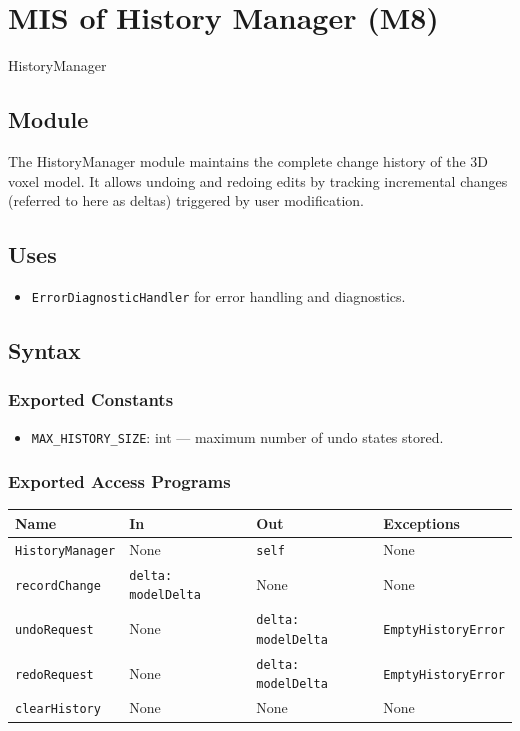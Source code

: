 \documentclass[12pt, titlepage]{article}
\begin{document}
\section{MIS of History Manager (M8)}\label{Module10}

HistoryManager

\subsection{Module}
The HistoryManager module maintains the complete change history of the 3D voxel model. It allows undoing and redoing edits by tracking incremental changes (referred to here as deltas) triggered by user modification.

\subsection{Uses}
\begin{itemize}
  \item \texttt{ErrorDiagnosticHandler} for error handling and diagnostics.
\end{itemize}

\subsection{Syntax}

\subsubsection{Exported Constants}
\begin{itemize}
  \item \texttt{MAX\_HISTORY\_SIZE}: int — maximum number of undo states stored.
\end{itemize}

\subsubsection{Exported Access Programs}
\begin{center}
\renewcommand{\arraystretch}{1.3}
\begin{tabular}{p{4cm} p{4.5cm} p{3.5cm} p{3.5cm}}
\toprule
\textbf{Name} & \textbf{In} & \textbf{Out} & \textbf{Exceptions} \\
\midrule
\texttt{HistoryManager} & None & \texttt{self} & None \\
\texttt{recordChange} & \texttt{delta: modelDelta} & None & None \\
\texttt{undoRequest} & None & \texttt{delta: modelDelta} & \texttt{EmptyHistoryError} \\
\texttt{redoRequest} & None & \texttt{delta: modelDelta} & \texttt{EmptyHistoryError} \\
\texttt{clearHistory} & None & None & None \\
\bottomrule
\end{tabular}
\end{center}
\end{document}
